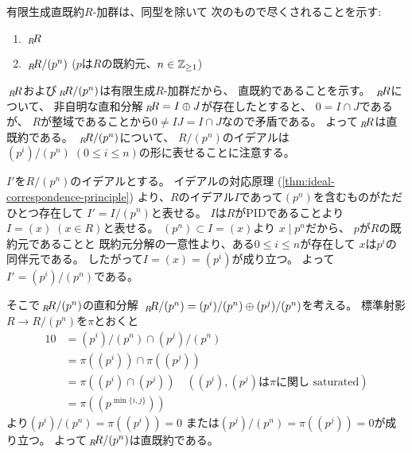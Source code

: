\documentclass[report]{jlreq}
\begin{document}
\begin{answer}
    有限生成直既約$R$-加群は、同型を除いて
    次のもので尽くされることを示す:
    \begin{enumerate}
        \item $\,{}_{R}\!R$
        \item $\,{}_{R}\!R / (p^n)$ \quad
            ($p$は$R$の既約元、$n \in \mathbb{Z}_{\ge 1}$)
    \end{enumerate}

    $\,{}_{R}\!R$および$\,{}_{R}\!R / (p^n)$は有限生成$R$-加群だから、
    直既約であることを示す。
    $\,{}_{R}\!R$について、
    非自明な直和分解$\,{}_{R}\!R = I \oplus J$が存在したとすると、
    $0 = I \cap J$であるが、
    $R$が整域であることから$0 \neq IJ = I \cap J$なので矛盾である。
    よって$\,{}_{R}\!R$は直既約である。
    $\,{}_{R}\!R / (p^n)$について、
    $R / (p^n)$のイデアルは
    $(p^i) / (p^n) \; (0 \le i \le n)$の形に表せることに注意する。
    \begin{innerproof}
        $I'$を$R / (p^n)$のイデアルとする。
        イデアルの対応原理
        (\cref{thm:ideal-correspondence-principle})
        より、$R$のイデアル$I$であって$(p^n)$を含むものがただひとつ存在して
        $I' = I / (p^n)$と表せる。
        $I$は$R$がPIDであることより$I = (x) \; (x \in R)$と表せる。
        $(p^n) \subset I = (x)$より
        $x \mid p^n$だから、
        $p$が$R$の既約元であることと
        既約元分解の一意性より、ある$0 \le i \le n$が存在して
        $x$は$p^i$の同伴元である。
        したがって$I = (x) = (p^i)$が成り立つ。
        よって$I' = (p^i) / (p^n)$である。
    \end{innerproof}
    そこで$\,{}_{R}\!R / (p^n)$の直和分解
    $\,{}_{R}\!R / (p^n) = (p^i) / (p^n) \oplus (p^j) / (p^n)$を考える。
    標準射影$R \to R / (p^n)$を$\pi$とおくと
    \begin{alignat}{1}
        0
            &= (p^i) / (p^n) \cap (p^j) / (p^n) \\
            &= \pi((p^i)) \cap \pi((p^j)) \\
            &= \pi((p^i) \cap (p^j))
                \quad (\text{$(p^i), (p^j)$は$\pi$に関し saturated}) \\
            &= \pi((p^{\min\{i, j\}}))
    \end{alignat}
    より$(p^i) / (p^n) = \pi((p^i)) = 0$
    または$(p^j) / (p^n) = \pi((p^j)) = 0$が成り立つ。
    よって$\,{}_{R}\!R / (p^n)$は直既約である。


\end{answer}
\end{document}
